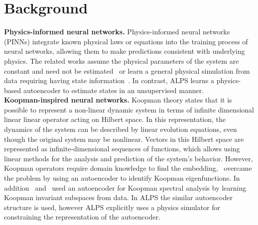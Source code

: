 \documentclass[acmtog]{techreportacmart}
\begin{document}
\section{Background} %
\textbf{Physics-informed neural networks.} Physics-informed neural networks (PINNs) integrate known physical laws or equations into the training process of neural networks, allowing them to make predictions consistent with underlying physics. The related works assume the physical parameters of the system are constant and need not be estimated~\cite{gupta2019general} or learn a general physical simulation from data requiring having state information~\cite{sanchez2020learning}. In contrast, ALPS learns a physics-based autoencoder to estimate states in an unsupervised manner.
\\
\textbf{Koopman-inspired neural networks.} Koopman theory states that it is possible to represent a non-linear dynamic system in terms of infinite dimensional linear linear operator acting on Hilbert space. In this representation, the dynamics of the system can be described by linear evolution equations, even though the original system may be nonlinear. Vectors in this Hilbert space are represented as infinite-dimensional sequences of functions, which allows using linear methods for the analysis and prediction of the system's behavior. However, Koopman operators require domain knowledge to find the embedding,~\cite{Lusch2018} overcame the problem by using an autoencoder to identify Koopman eigenfunctions. In addition~\cite{takeishi2017learning} and~\cite{otto2019linearly} used an autoencoder for Koopman spectral analysis by learning Koopman invariant subspaces from data. In ALPS the similar autoencoder structure is used, however ALPS explicitly uses a physics simulator for constraining the representation of the autoencoder.
\end{document}
